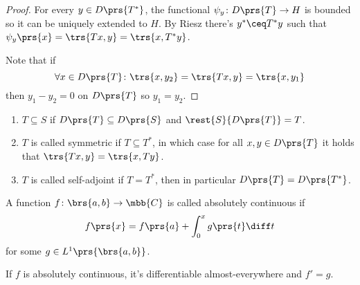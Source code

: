 \documentclass[10pt, twoside]{book}
\begin{document}
\begin{proof}
For every $y \in D\prs{T^*}$, the functional $\psi_y \colon D\prs{T} \to H$ is bounded so it can be uniquely extended to $H$. By Riesz there's $y^* \ceq T^* y$ such that $\psi_y\prs{x} = \trs{Tx,y} = \trs{x,T^* y}$.

Note that if
\[\forall x \in D\prs{T} \colon \trs{x, y_2} = \trs{Tx, y} = \trs{x,y_1}\]
then $y_1 - y_2 = 0$ on $D\prs{T}$ so $y_1 = y_2$.
\end{proof}

\begin{definition}
\begin{enumerate}
\item $T \subseteq S$ if $D\prs{T} \subseteq D\prs{S}$ and $\rest{S}{D\prs{T}} = T$.
\item $T$ is called symmetric if $T \subseteq T^*$, in which case for all $x,y \in D\prs{T}$ it holds that $\trs{Tx, y} = \trs{x, Ty}$.
\item $T$ is called self-adjoint if $T = T^*$, then in particular $D\prs{T} = D\prs{T^*}$.
\end{enumerate}
\end{definition}

\begin{definition}
A function $f \colon \brs{a,b} \to \mbb{C}$ is called absolutely continuous if \[f\prs{x} = f\prs{a} + \int_0^x g\prs{t} \diff t\]
for some $g \in L^1\prs{\brs{a,b}}$.
\end{definition}

\begin{remark}
If $f$ is absolutely continuous, it's differentiable almost-everywhere and $f' = g$.
\end{remark}
\end{document}
